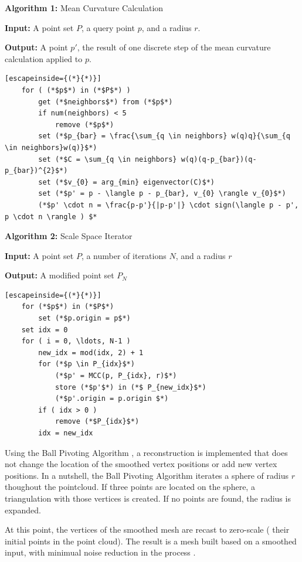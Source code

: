 \documentclass[12pt]{drexelthesis}
\begin{document}
\textbf{Algorithm 1:} Mean Curvature Calculation

	\textbf{Input:} A point set $P$, a query point $p$, and a radius $r$.
	
	\textbf{Output:} A point $p'$, the result of one discrete step of the mean curvature calculation applied to $p$.
\begin{lstlisting}[escapeinside={(*}{*)}]
	for ( (*$p$*) in (*$P$*) )
		get (*$neighbors$*) from (*$p$*)
		if num(neighbors) < 5
			remove (*$p$*)
		set (*$p_{bar} = \frac{\sum_{q \in neighbors} w(q)q}{\sum_{q \in neighbors}w(q)}$*)
		set (*$C = \sum_{q \in neighbors} w(q)(q-p_{bar})(q-p_{bar})^{2}$*)
		set (*$v_{0} = arg_{min} eigenvector(C)$*)
		set (*$p' = p - \langle p - p_{bar}, v_{0} \rangle v_{0}$*)
		(*$p' \cdot n = \frac{p-p'}{|p-p'|} \cdot sign(\langle p - p', p \cdot n \rangle ) $*	
\end{lstlisting}

\textbf{Algorithm 2:} Scale Space Iterator

	\textbf{Input:} A point set $P$, a number of iterations $N$, and a radius $r$
	
	\textbf{Output:} A modified point set $P_{N}$


\begin{lstlisting}[escapeinside={(*}{*)}]
	for (*$p$*) in (*$P$*)
		set (*$p.origin = p$*)
	set idx = 0
	for ( i = 0, \ldots, N-1 )
		new_idx = mod(idx, 2) + 1
		for (*$p \in P_{idx}$*)
			(*$p' = MCC(p, P_{idx}, r)$*)
			store (*$p'$*) in (*$ P_{new_idx}$*)
			(*$p'.origin = p.origin $*)
		if ( idx > 0 )
			remove (*$P_{idx}$*)
		idx = new_idx
\end{lstlisting}

Using the Ball Pivoting Algorithm \cite{ballpivot}, a reconstruction is implemented that does not change the location of the smoothed vertex positions or add new vertex positions. In a nutshell, the Ball Pivoting Algorithm iterates a sphere of radius $r$ thoughout the pointcloud. If three points are located on the sphere, a triangulation with those vertices is created. If no points are found, the radius is expanded.

At this point, the vertices of the smoothed mesh are recast to zero-scale ( their initial points in the point cloud). The result is a mesh built based on a smoothed input, with minimual noise reduction in the process \cite{RN67}.
\end{document}
